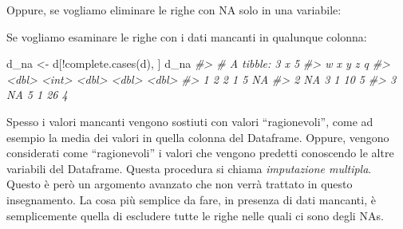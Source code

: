 \documentclass[
  11pt,
]{krantz}
\makeatletter
\newenvironment{Shaded}{\begin{snugshade}}{\end{snugshade}}
\newcommand{\CommentTok}[1]{\textcolor[rgb]{0.37,0.37,0.37}{\textit{#1}}}
\newcommand{\FunctionTok}[1]{\textcolor[rgb]{0,0,0}{#1}}
\newcommand{\NormalTok}[1]{#1}
\newcommand{\OtherTok}[1]{\textcolor[rgb]{0.37,0.37,0.37}{#1}}
\newcommand{\SpecialCharTok}[1]{\textcolor[rgb]{0,0,0}{#1}}
\newenvironment{kframe}{%
\medskip{}
\setlength{\fboxsep}{.8em}
 \def\at@end@of@kframe{}%
 \ifinner\ifhmode%
  \def\at@end@of@kframe{\end{minipage}}%
  \begin{minipage}{\columnwidth}%
 \fi\fi%
 \def\FrameCommand##1{\hskip\@totalleftmargin \hskip-\fboxsep
 \colorbox{shadecolor}{##1}\hskip-\fboxsep
     \hskip-\linewidth \hskip-\@totalleftmargin \hskip\columnwidth}%
 \MakeFramed {\advance\hsize-\width
   \@totalleftmargin\z@ \linewidth\hsize
   \@setminipage}}%
 {\par\unskip\endMakeFramed%
 \at@end@of@kframe}
\renewenvironment{Shaded}{\begin{kframe}}{\end{kframe}}
\theoremstyle{definition}
\theoremstyle{definition}
\theoremstyle{definition}
\theoremstyle{definition}
\theoremstyle{remark}
\makeatother
\begin{document}
Oppure, se vogliamo eliminare le righe con NA solo in una variabile:

\begin{Shaded}
\end{Shaded}

Se vogliamo esaminare le righe con i dati mancanti in qualunque colonna:

\begin{Shaded}
\begin{Highlighting}[]
\NormalTok{d\_na }\OtherTok{\textless{}{-}}\NormalTok{ d[}\SpecialCharTok{!}\FunctionTok{complete.cases}\NormalTok{(d), ]}
\NormalTok{d\_na}
\CommentTok{\#\textgreater{} \# A tibble: 3 x 5}
\CommentTok{\#\textgreater{}       w     x     y     z     q}
\CommentTok{\#\textgreater{}   \textless{}dbl\textgreater{} \textless{}int\textgreater{} \textless{}dbl\textgreater{} \textless{}dbl\textgreater{} \textless{}dbl\textgreater{}}
\CommentTok{\#\textgreater{} 1     2     2     1     5    NA}
\CommentTok{\#\textgreater{} 2    NA     3     1    10     5}
\CommentTok{\#\textgreater{} 3    NA     5     1    26     4}
\end{Highlighting}
\end{Shaded}

Spesso i valori mancanti vengono sostiuti con valori ``ragionevoli'', come ad esempio la media dei valori in quella colonna del Dataframe. Oppure, vengono considerati come ``ragionevoli'' i valori che vengono predetti conoscendo le altre variabili del Dataframe. Questa procedura si chiama \emph{imputazione multipla}. Questo è però un argomento avanzato che non verrà trattato in questo insegnamento. La cosa più semplice da fare, in presenza di dati mancanti, è semplicemente quella di escludere tutte le righe nelle quali ci sono degli NAs.

  

\printindex
\end{document}
